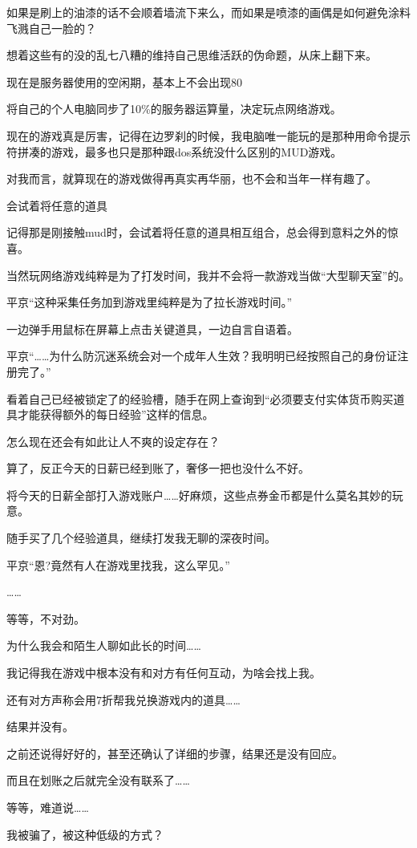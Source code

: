 如果是刷上的油漆的话不会顺着墙流下来么，而如果是喷漆的画偶是如何避免涂料飞溅自己一脸的？

想着这些有的没的乱七八糟的维持自己思维活跃的伪命题，从床上翻下来。

现在是服务器使用的空闲期，基本上不会出现80%

将自己的个人电脑同步了10\%的服务器运算量，决定玩点网络游戏。

现在的游戏真是厉害，记得在边罗刹的时候，我电脑唯一能玩的是那种用命令提示符拼凑的游戏，最多也只是那种跟dos系统没什么区别的MUD游戏。

对我而言，就算现在的游戏做得再真实再华丽，也不会和当年一样有趣了。

会试着将任意的道具

记得那是刚接触mud时，会试着将任意的道具相互组合，总会得到意料之外的惊喜。

当然玩网络游戏纯粹是为了打发时间，我并不会将一款游戏当做“大型聊天室”的。

平京“这种采集任务加到游戏里纯粹是为了拉长游戏时间。”

一边弹手用鼠标在屏幕上点击关键道具，一边自言自语着。

平京“……为什么防沉迷系统会对一个成年人生效？我明明已经按照自己的身份证注册完了。”

看着自己已经被锁定了的经验槽，随手在网上查询到“必须要支付实体货币购买道具才能获得额外的每日经验”这样的信息。

怎么现在还会有如此让人不爽的设定存在？

算了，反正今天的日薪已经到账了，奢侈一把也没什么不好。

将今天的日薪全部打入游戏账户……好麻烦，这些点券金币都是什么莫名其妙的玩意。

随手买了几个经验道具，继续打发我无聊的深夜时间。

平京“恩?竟然有人在游戏里找我，这么罕见。”

……

等等，不对劲。

为什么我会和陌生人聊如此长的时间……

我记得我在游戏中根本没有和对方有任何互动，为啥会找上我。

还有对方声称会用7折帮我兑换游戏内的道具……

结果并没有。

之前还说得好好的，甚至还确认了详细的步骤，结果还是没有回应。

而且在划账之后就完全没有联系了……

等等，难道说……

我被骗了，被这种低级的方式？

